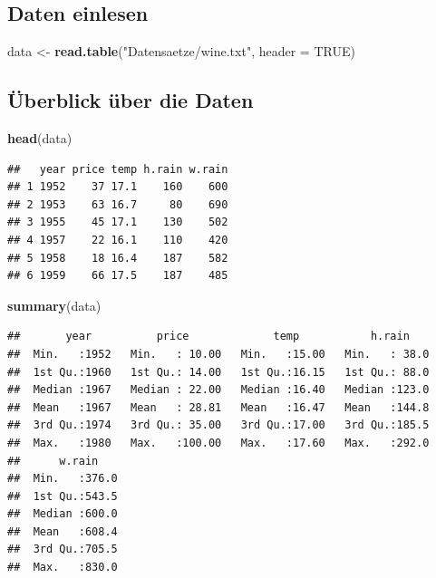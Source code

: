 \documentclass[]{article}
\newenvironment{Shaded}{\begin{snugshade}}{\end{snugshade}}
\newcommand{\DataTypeTok}[1]{\textcolor[rgb]{0.13,0.29,0.53}{#1}}
\newcommand{\KeywordTok}[1]{\textcolor[rgb]{0.13,0.29,0.53}{\textbf{#1}}}
\newcommand{\NormalTok}[1]{#1}
\newcommand{\OtherTok}[1]{\textcolor[rgb]{0.56,0.35,0.01}{#1}}
\newcommand{\StringTok}[1]{\textcolor[rgb]{0.31,0.60,0.02}{#1}}
\begin{document}
\hypertarget{daten-einlesen}{%
\subsection{Daten einlesen}\label{daten-einlesen}}

\begin{Shaded}
\begin{Highlighting}[]
\NormalTok{data <-}\StringTok{ }\KeywordTok{read.table}\NormalTok{(}\StringTok{"Datensaetze/wine.txt"}\NormalTok{, }\DataTypeTok{header =} \OtherTok{TRUE}\NormalTok{)}
\end{Highlighting}
\end{Shaded}

\hypertarget{uxfcberblick-uxfcber-die-daten}{%
\subsection{Überblick über die Daten}\label{uxfcberblick-uxfcber-die-daten}}

\begin{Shaded}
\begin{Highlighting}[]
\KeywordTok{head}\NormalTok{(data)}
\end{Highlighting}
\end{Shaded}

\begin{verbatim}
##   year price temp h.rain w.rain
## 1 1952    37 17.1    160    600
## 2 1953    63 16.7     80    690
## 3 1955    45 17.1    130    502
## 4 1957    22 16.1    110    420
## 5 1958    18 16.4    187    582
## 6 1959    66 17.5    187    485
\end{verbatim}

\begin{Shaded}
\begin{Highlighting}[]
\KeywordTok{summary}\NormalTok{(data)}
\end{Highlighting}
\end{Shaded}

\begin{verbatim}
##       year          price             temp           h.rain     
##  Min.   :1952   Min.   : 10.00   Min.   :15.00   Min.   : 38.0  
##  1st Qu.:1960   1st Qu.: 14.00   1st Qu.:16.15   1st Qu.: 88.0  
##  Median :1967   Median : 22.00   Median :16.40   Median :123.0  
##  Mean   :1967   Mean   : 28.81   Mean   :16.47   Mean   :144.8  
##  3rd Qu.:1974   3rd Qu.: 35.00   3rd Qu.:17.00   3rd Qu.:185.5  
##  Max.   :1980   Max.   :100.00   Max.   :17.60   Max.   :292.0  
##      w.rain     
##  Min.   :376.0  
##  1st Qu.:543.5  
##  Median :600.0  
##  Mean   :608.4  
##  3rd Qu.:705.5  
##  Max.   :830.0
\end{verbatim}
\end{document}

